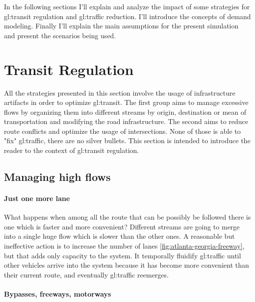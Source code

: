 In the following sections I'll explain and analyze the impact of some strategies for \gls{gl:transit} regulation and \gls{gl:traffic} reduction. I'll introduce the concepts of demand modeling. Finally I'll explain the main assumptions for the present simulation and present the scenarios being used.

\section{Transit Regulation}

All the strategies presented in this section involve the usage of infrastructure artifacts in order to optimize \gls{gl:transit}. The first group aims to manage excessive flows by organizing them into different streams by origin, destination or mean of transportation and modifying the road infrastructure. The second aims to reduce route conflicts and optimize the usage of intersections. None of those is able to "fix" \gls{gl:traffic}, there are no silver bullets. This section is intended to introduce the reader to the context of \gls{gl:transit} regulation.

\subsection{Managing high flows}

\paragraph{Just one more lane}

What happens when among all the route that can be possibly be followed there is one which is faster and more convenient? Different streams are going to merge into a single huge flow which is slower than the other ones. A reasonable but ineffective action is to increase the number of lanes \ref{fig:atlanta-georgia-freeway}, but that adds only capacity to the system. It temporally fluidify \gls{gl:traffic} until other vehicles arrive into the system because it has become more convenient than their current route, and eventually \gls{gl:traffic} reemerges.


\paragraph{Bypasses, freeways, motorways}

